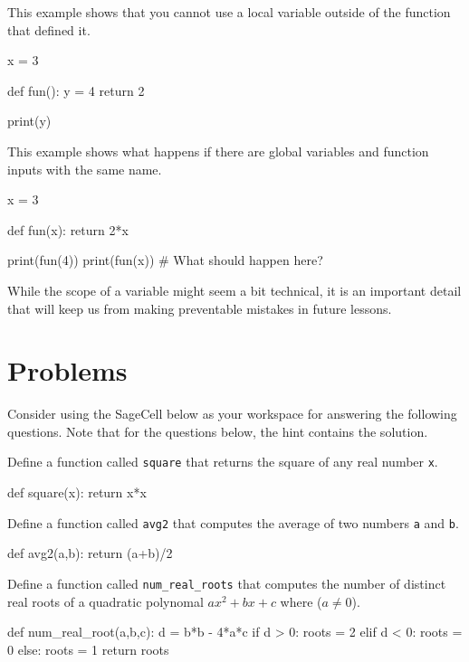 \documentclass{ximera}
\begin{document}
This example shows that you cannot use a local variable outside of the function that defined it.

\begin{sageCell}
x = 3

def fun():
        y = 4
        return 2

print(y)
\end{sageCell}

This example shows what happens if there are global variables and function inputs with the same name.

\begin{sageCell}
x = 3

def fun(x):
	return 2*x

print(fun(4))
print(fun(x))     # What should happen here?
\end{sageCell}

While the scope of a variable might seem a bit technical, it is an important detail that will keep us from making preventable mistakes in future lessons.

\section{Problems}

Consider using the SageCell below as your workspace for answering the following questions. Note that for the questions below, the hint contains the solution.

\begin{question}
	Define a function called \verb|square| that returns the square of any real number \verb|x|. 
	\begin{hint}
\begin{sageCell}
def square(x):
        return x*x
\end{sageCell}
	\end{hint}
\end{question}

\begin{question}
	Define a function called \verb|avg2| that computes the average of two numbers \verb|a| and \verb|b|.
	\begin{hint}
\begin{sageCell}
def avg2(a,b):
        return (a+b)/2
\end{sageCell}
	\end{hint}
\end{question}

\begin{question}
	Define a function called \verb|num_real_roots| that computes the number of distinct real roots of a quadratic polynomal $ax^2+bx+c$ where ($a\neq 0$).
	\begin{hint}
\begin{sageCell}
def num_real_root(a,b,c):
        d = b*b - 4*a*c
	if d > 0:
                roots = 2
	elif d < 0:
                roots = 0
        else:
                roots = 1
        return roots
\end{sageCell}
	\end{hint}
\end{question}

\begin{sageCell}
\end{sageCell}
\end{document}

